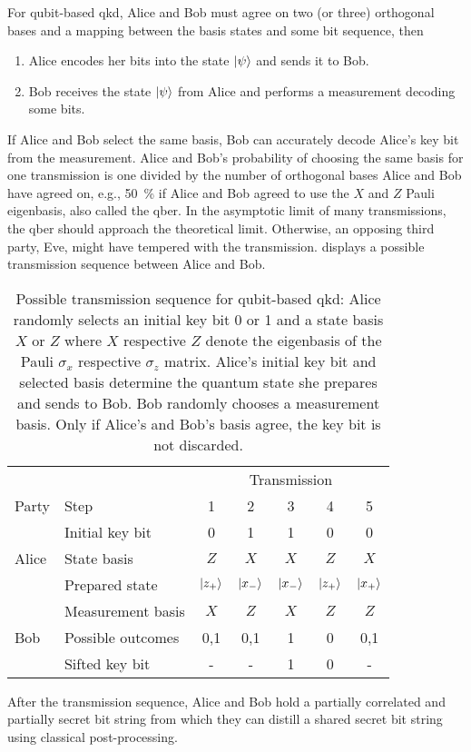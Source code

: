 For qubit-based \gls{qkd}, Alice and Bob must agree on two (or three) orthogonal bases and a mapping between the basis states and some bit sequence, then
\begin{enumerate}
	\item Alice encodes her bits into the state $\ket{\psi}$ and sends it to Bob.
	\item Bob receives the state $\ket{\psi}$ from Alice and performs a measurement decoding some bits.
\end{enumerate}
If Alice and Bob select the same basis, Bob can accurately decode Alice's key bit from the measurement.
Alice and Bob's probability of choosing the same basis for one transmission is one divided by the number of orthogonal bases Alice and Bob have agreed on, e.g., \SI{50}{\percent} if Alice and Bob agreed to use the $X$ and $Z$ Pauli eigenbasis, also called the \gls{qber}.
In the asymptotic limit of many transmissions, the \gls{qber} should approach the theoretical limit.
Otherwise, an opposing third party, Eve, might have tempered with the transmission.
 displays a possible transmission sequence between Alice and Bob.
\begin{table}[htb]
	\centering
	\begin{tabular}{llccccc}
		\toprule
		& & \multicolumn{5}{c}{Transmission} \\
		\cmidrule{3-7}
		Party & Step & 1 & 2 & 3 & 4 & 5 \\ 
		\midrule
		\multirow{3}{*}{Alice} & Initial key bit & \num{0} & \num{1} & \num{1} & \num{0} & \num{0} \\
		& State basis & $Z$ & $X$ & $X$ & $Z$ & $X$ \\
		& Prepared state & $\ket{z_+}$ & $\ket{x_-}$ & $\ket{x_-}$ & $\ket{z_+}$ & $\ket{x_+}$ \\
		\cmidrule{1-1}
		\multirow{3}{*}{Bob} & Measurement basis & $X$ & $Z$ & $X$ & $Z$ & $Z$ \\
		& Possible outcomes & \num{0},\num{1} & \num{0},\num{1} & \num{1} & \num{0} & \num{0},\num{1} \\
		& Sifted key bit & - & - & 1 & 0 & - \\
		\bottomrule
	\end{tabular}
	\caption{Possible transmission sequence for qubit-based \gls{qkd}: Alice randomly selects an initial key bit \num{0} or \num{1} and a state basis $X$ or $Z$ where $X$ respective $Z$ denote the eigenbasis of the Pauli $\sigma_x$ respective $\sigma_z$ matrix. Alice's initial key bit and selected basis determine the quantum state she prepares and sends to Bob. Bob randomly chooses a measurement basis. Only if Alice's and Bob's basis agree, the key bit is not discarded.}\label{tab:dvqkd_transmission_sequence}
\end{table}
After the transmission sequence, Alice and Bob hold a partially correlated and partially secret bit string from which they can distill a shared secret bit string using classical post-processing.

